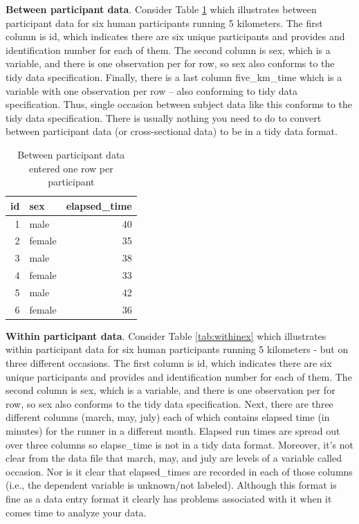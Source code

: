 \documentclass[
]{krantz}
\begin{document}
\textbf{Between participant data}. Consider Table \ref{tab:betweenex} which illustrates between participant data for six human participants running 5 kilometers. The first column is id, which indicates there are six unique participants and provides and identification number for each of them. The second column is sex, which is a variable, and there is one observation per for row, so sex also conforms to the tidy data specification. Finally, there is a last column five\_km\_time which is a variable with one observation per row -- also conforming to tidy data specification. Thus, single occasion between subject data like this conforms to the tidy data specification. There is usually nothing you need to do to convert between participant data (or cross-sectional data) to be in a tidy data format.

\begin{table}

\caption{\label{tab:betweenex}Between participant data entered one row per participant}
\centering
\begin{tabular}[t]{rlr}
\toprule
id & sex & elapsed\_time\\
\midrule
1 & male & 40\\
2 & female & 35\\
3 & male & 38\\
4 & female & 33\\
5 & male & 42\\
6 & female & 36\\
\bottomrule
\end{tabular}
\end{table}

\textbf{Within participant data}. Consider Table \ref{tab:withinex} which illustrates within participant data for six human participants running 5 kilometers - but on three different occasions. The first column is id, which indicates there are six unique participants and provides and identification number for each of them. The second column is sex, which is a variable, and there is one observation per for row, so sex also conforms to the tidy data specification. Next, there are three different columns (march, may, july) each of which contains elapsed time (in minutes) for the runner in a different month. Elapsed run times are spread out over three columns so elapse\_time is not in a tidy data format. Moreover, it's not clear from the data file that march, may, and july are levels of a variable called occasion. Nor is it clear that elapsed\_times are recorded in each of those columns (i.e., the dependent variable is unknown/not labeled). Although this format is fine as a data entry format it clearly has problems associated with it when it comes time to analyze your data.
\end{document}
